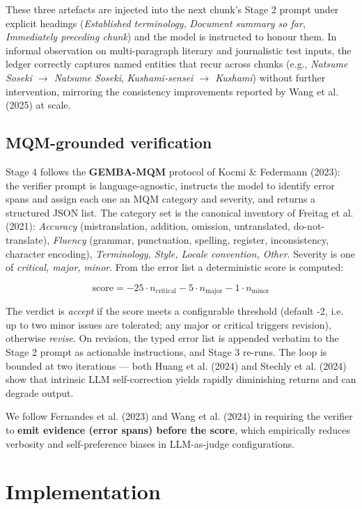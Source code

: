\documentclass[11pt]{article}
\begin{document}
These three artefacts are injected into the next chunk's Stage 2 prompt under explicit headings (\emph{Established terminology}, \emph{Document summary so far}, \emph{Immediately preceding chunk}) and the model is instructed to honour them. In informal observation on multi-paragraph literary and journalistic test inputs, the ledger correctly captures named entities that recur across chunks (e.g., \emph{Natsume Soseki $\rightarrow$ Natsume Soseki}, \emph{Kushami-sensei $\rightarrow$ Kushami}) without further intervention, mirroring the consistency improvements reported by Wang et al. (2025) at scale.

\subsection{MQM-grounded verification}

Stage 4 follows the \textbf{GEMBA-MQM} protocol of Kocmi \& Federmann (2023): the verifier prompt is language-agnostic, instructs the model to identify error spans and assign each one an MQM category and severity, and returns a structured JSON list. The category set is the canonical inventory of Freitag et al. (2021): \emph{Accuracy} (mistranslation, addition, omission, untranslated, do-not-translate), \emph{Fluency} (grammar, punctuation, spelling, register, inconsistency, character encoding), \emph{Terminology, Style, Locale convention, Other}. Severity is one of \emph{critical, major, minor}. From the error list a deterministic score is computed:

\[
\mathrm{score} = -25 \cdot n_{\text{critical}} - 5 \cdot n_{\text{major}} - 1 \cdot n_{\text{minor}}
\]

The verdict is \emph{accept} if the score meets a configurable threshold (default -2, i.e. up to two minor issues are tolerated; any major or critical triggers revision), otherwise \emph{revise}. On revision, the typed error list is appended verbatim to the Stage 2 prompt as actionable instructions, and Stage 3 re-runs. The loop is bounded at two iterations --- both Huang et al. (2024) and Stechly et al. (2024) show that intrinsic LLM self-correction yields rapidly diminishing returns and can degrade output.

We follow Fernandes et al. (2023) and Wang et al. (2024) in requiring the verifier to \textbf{emit evidence (error spans) before the score}, which empirically reduces verbosity and self-preference biases in LLM-as-judge configurations.

\section{Implementation}
\end{document}
